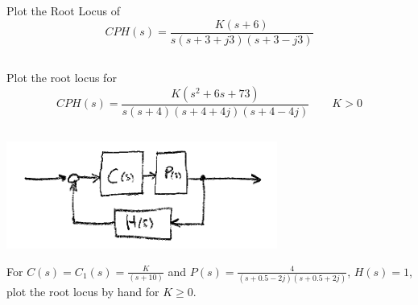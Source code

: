 \documentclass{article}	%
\begin{document}


\subsection{}  Plot the Root Locus of
\[
CPH(s) = \frac{K(s+6)}{s(s+3+j3)(s+3-j3)}
\]


\subsection{}

Plot the root locus for
\[
CPH(s) = \frac{K(s^2+6s+73)}{s(s+4)(s+4+4j)(s+4-4j)} \qquad K>0
\]


%
%
%
%
%
%




\subsection{}\label{basicRL}

\includegraphics[width=3.5in]{00479.png}

For $C(s) = C_1(s) = \frac{K}{(s+10)}$ and $P(s) = \frac{4}{(s+0.5-2j)(s+0.5+2j)}$, $H(s) = 1$, plot the
root locus by hand for $K\geq 0$.

%
\end{document}
